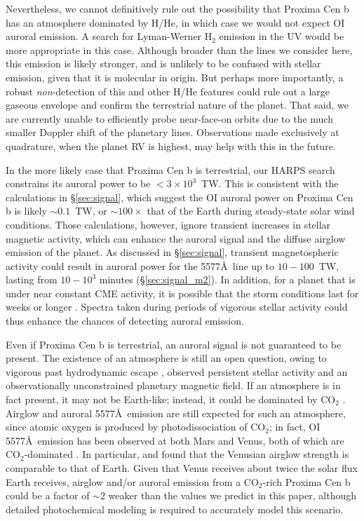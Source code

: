 \documentclass{emulateapj}
\newcommand{\XXX}[1]{#1}      %
\begin{document}
Nevertheless, \XXX{we cannot definitively rule out the possibility that Proxima Cen b has an atmosphere dominated by H/He, in which case we would not expect OI auroral emission.} A search for Lyman-Werner H$_2$ emission in the UV would be more appropriate in this case. Although broader than the lines we consider here, this emission is likely stronger, and is unlikely to be confused with stellar emission, given that it is molecular in origin. But perhaps more importantly, a robust \textit{non}-detection of this and other H/He features could rule out a large gaseous envelope and confirm the terrestrial nature of the planet. That said, we are currently unable to efficiently probe near-face-on orbits due to the much smaller Doppler shift of the planetary lines. Observations made exclusively at quadrature, when the planet RV is highest, may help with this in the future.

In the more likely case that Proxima Cen b is terrestrial, our HARPS search constrains its auroral power to be $< 3\times 10^{3}$~TW. This is consistent with the calculations in \S\ref{sec:signal}, which suggest the OI auroral power on Proxima Cen b is \XXX{likely ${\sim} 0.1$~TW}, or ${\sim} 100\times$ that of the Earth during steady-state solar wind conditions. Those calculations, however, ignore transient increases in stellar magnetic activity, which can enhance the auroral signal and the diffuse airglow emission of the planet. As discussed in \S\ref{sec:signal}, transient magnetospheric activity could result in auroral power for the 5577\AA\ line up to $10-100$~TW, lasting from $10-10^3$ minutes (\S\ref{sec:signal_m2}).  In addition, for a planet that is under near constant CME activity, it is possible that the storm conditions last for weeks or longer \citep{Gonzalez1994,Gonzalez1999}. Spectra taken during periods of vigorous stellar activity could thus enhance the chances of detecting auroral emission.

Even if Proxima Cen b is terrestrial, an auroral signal is not guaranteed to be present. The existence of an atmosphere is still an open question, owing to vigorous past hydrodynamic escape \citep{LugerBarnes2015, Barnes2016}, observed persistent stellar activity \citep{Davenport2016} and an observationally unconstrained planetary magnetic field. \XXX{If an atmosphere is in fact present, it may not be Earth-like; instead, it could be dominated by CO$_2$ \citep[e.g.][]{Meadows2016}. Airglow and auroral 5577\AA\ emission are still expected for such an atmosphere, since atomic oxygen is produced by photodissociation of CO$_2$; in fact, OI 5577\AA\ emission has been observed at both Mars and Venus, both of which are CO$_2$-dominated \citep[e.g.][]{Bertaux2005, Slanger2001}. In particular, \citet{Slanger2001} and \citet{Slanger2006} found that the Venusian airglow strength is comparable to that of Earth. Given that Venus receives about twice the solar flux Earth receives, airglow and/or auroral emission from a CO$_2$-rich Proxima Cen b could be a factor of ${\sim}2$ weaker than the values we predict in this paper, although detailed photochemical modeling is required to accurately model this scenario.} 
\end{document}
